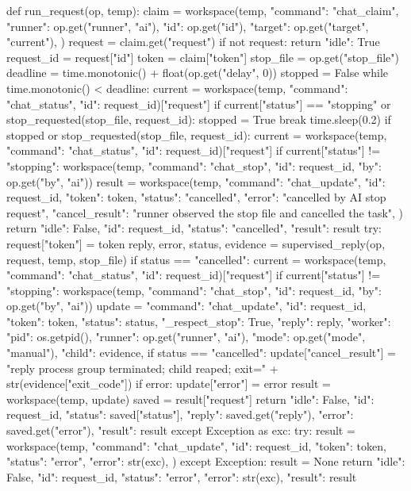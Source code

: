 def run_request(op, temp):
    claim = workspace(temp, {
        "command": "chat_claim",
        "runner": op.get("runner", "ai"),
        "id": op.get("id"),
        "target": op.get("target", "current"),
    })
    request = claim.get("request")
    if not request:
        return {"idle": True}
    request_id = request["id"]
    token = claim["token"]
    stop_file = op.get("stop_file")
    deadline = time.monotonic() + float(op.get("delay", 0))
    stopped = False
    while time.monotonic() < deadline:
        current = workspace(temp, {"command": "chat_status", "id": request_id})["request"]
        if current["status"] == "stopping" or stop_requested(stop_file, request_id):
            stopped = True
            break
        time.sleep(0.2)
    if stopped or stop_requested(stop_file, request_id):
        current = workspace(temp, {"command": "chat_status", "id": request_id})["request"]
        if current["status"] != "stopping":
            workspace(temp, {"command": "chat_stop", "id": request_id, "by": op.get("by", "ai")})
        result = workspace(temp, {
            "command": "chat_update",
            "id": request_id,
            "token": token,
            "status": "cancelled",
            "error": "cancelled by AI stop request",
            "cancel_result": "runner observed the stop file and cancelled the task",
        })
        return {"idle": False, "id": request_id, "status": "cancelled", "result": result}
    try:
        request["token"] = token
        reply, error, status, evidence = supervised_reply(op, request, temp, stop_file)
        if status == "cancelled":
            current = workspace(temp, {"command": "chat_status", "id": request_id})["request"]
            if current["status"] != "stopping":
                workspace(temp, {"command": "chat_stop", "id": request_id,
                                 "by": op.get("by", "ai")})
        update = {
            "command": "chat_update",
            "id": request_id,
            "token": token,
            "status": status,
            "_respect_stop": True,
            "reply": reply,
            "worker": {"pid": os.getpid(), "runner": op.get("runner", "ai"),
                       "mode": op.get("mode", "manual"), "child": evidence},
        }
        if status == "cancelled":
            update["cancel_result"] = "reply process group terminated; child reaped; exit=" + str(evidence["exit_code"])
        if error:
            update["error"] = error
        result = workspace(temp, update)
        saved = result["request"]
        return {"idle": False, "id": request_id, "status": saved["status"],
                "reply": saved.get("reply"), "error": saved.get("error"), "result": result}
    except Exception as exc:
        try:
            result = workspace(temp, {
                "command": "chat_update",
                "id": request_id,
                "token": token,
                "status": "error",
                "error": str(exc),
            })
        except Exception:
            result = None
        return {"idle": False, "id": request_id, "status": "error",
                "error": str(exc), "result": result}


